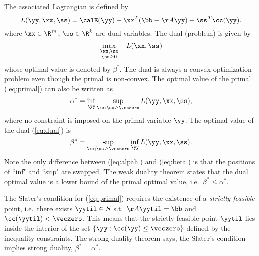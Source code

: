 The associated Lagrangian is defined by
\[
  L(\yy, \xx, \ss) = \calE(\yy) + \xx^T(\bb-\AA\yy) + \ss^T\cc(\yy).
\]
where $\xx \in \R^m$, $\ss \in \R^k$ are dual variables. The dual (problem) is given by
\begin{equation}
  \label{eq:dual}
  \max_{\substack{\xx, \ss \\ \ss \geq 0}} \quad L(\xx,  \ss)
\end{equation}
whose optimal value is denoted by $\beta^*$. The dual is always a convex optimization problem even though the primal is non-convex.
The optimal value of the primal (\ref{eq:primal}) can also be written as
\begin{equation}\label{eq:alpah}
  \alpha^* = \inf_{\yy} \sup_{\xx; \ss\geq\veczero} L(\yy, \xx, \ss),
\end{equation}
where no constraint is imposed on the primal variable $\yy$.
The optimal value of the dual (\ref{eq:dual}) is
\begin{equation}\label{eq:beta}
  \beta^* = \sup_{\xx; \ss\geq\veczero} \inf_{\yy} L(\yy, \xx, \ss).
\end{equation}
Note the only difference between (\ref{eq:alpah}) and (\ref{eq:beta}) is that the positions of ``inf" and ``sup" are swapped.
The weak duality theorem states that the dual optimal value is a lower bound of the primal optimal value, i.e.\ $\beta^* \leq \alpha^*$.

The Slater's condition for (\ref{eq:primal}) requires the existence of a \emph{strictly feasible} point, i.e.\ there exists $\yytil\in S$ s.t.\ $\AA\yytil = \bb$ and $\cc(\yytil) < \veczero$.
This means that the strictly feasible point $\yytil$ lies inside the interior of the set $\{\yy : \cc(\yy) \leq \veczero\}$ defined by the inequality constraints.
The strong duality theorem says, the Slater's condition implies strong duality, $\beta^* = \alpha^*$.


